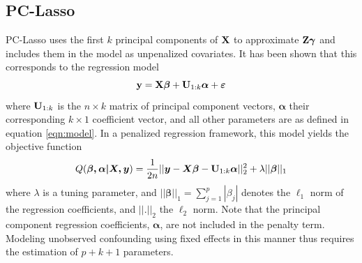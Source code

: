 \subsection{PC-Lasso}
PC-Lasso uses the first $k$ principal components of $\textbf{X}$ to approximate $\textbf{Z}\boldsymbol{\gamma}$ and includes them in the model as unpenalized covariates. It has been shown \cite{hoffman2013correcting} that this corresponds to the regression model
\begin{equation}
    \label{eqn:pca_reg}
    \textbf{y} = \textbf{X}\boldsymbol{\beta} + \textbf{U}_{1:k}\boldsymbol{\alpha} + \boldsymbol{\varepsilon} 
\end{equation}
where $\textbf{U}_{1:k}$ is the $n \times k$ matrix of principal component vectors, $\boldsymbol{\alpha}$ their corresponding $k \times 1$ coefficient vector, and all other parameters are as defined in equation \eqref{eqn:model}. In a penalized regression framework, this model yields the objective function
\begin{equation}
    \label{eqn:pca_obj}
    Q(\boldsymbol{\beta, \alpha| X, y}) = \frac{1}{2n} ||\boldsymbol{y} - \boldsymbol{X \beta} - \textbf{U}_{1:k}\boldsymbol{\alpha}||_2^2 + \lambda || \boldsymbol{\beta} ||_1
\end{equation}
where $\lambda$ is a tuning parameter, and $|| \boldsymbol{\beta} ||_1 = \sum_{j=1}^p |\beta_j|$ denotes the $\ell_1$ norm of the regression coefficients, and $||.||_2$ the $\ell_2$ norm. Note that the principal component regression coefficients, $\boldsymbol{\alpha}$, are not included in the penalty term. Modeling unobserved confounding using fixed effects in this manner thus requires the estimation of $p + k + 1$ parameters. 


